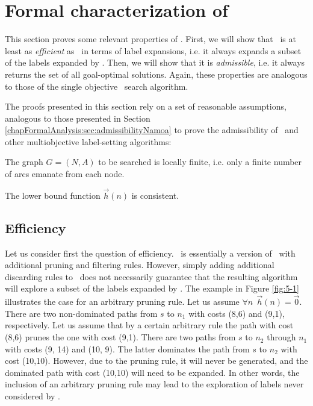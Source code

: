 \section{Formal characterization of \texorpdfstring{\lexgo}{LEXGO*}}
\label{chapFormalAnalysis:sec:analysisLEXGO}

This section proves some relevant properties of \lexgo. First, we will show that \lexgo \ is at least as \emph{efficient} as \namoa \ in terms of label expansions, i.e. it always expands a subset of the labels expanded by \namoa. Then, we will show that it is \emph{admissible}, i.e. it always returns the set of all goal-optimal solutions. Again, these properties are analogous to those of the single objective \astar \ search algorithm. 

The proofs presented in this section rely on a set of reasonable
assumptions, analogous to those presented in Section  \ref{chapFormalAnalysis:sec:admissibilityNamoa} to prove the admissibility of \namoa \ and other multiobjective label-setting algorithms:

\begin{supo}\label{supo-lexgo1}
The graph $G = (N,A)$ to be searched is locally finite, i.e. only a finite number of arcs emanate from each node.
\end{supo}

\begin{supo}\label{supo-lexgo2}
The lower bound function $\vec{h}(n)$ is consistent.
\end{supo}

\subsection{Efficiency}
\label{chapFormalAnalysis:sec:efficiencyLexgo}

Let us consider first the question of efficiency. \lexgo \ is essentially a version of \namoa \ with additional pruning and filtering rules. However, simply adding additional discarding rules to \namoa \ does not necessarily guarantee that the resulting algorithm will explore a subset of the labels expanded by \namoa. The example in Figure \ref{fig:5-1} illustrates the case for an arbitrary pruning rule. Let us assume $\forall n \ \ \vec h(n) = \vec 0$. There are two non-dominated paths from $s$ to $n_1$ with costs (8,6) and (9,1), respectively. Let us assume that by a certain arbitrary rule the path with cost (8,6) prunes the one with cost (9,1). There are two paths from $s$ to $n_2$ through $n_1$ with costs (9, 14) and (10, 9). The latter dominates the path from $s$ to $n_2$ with cost (10,10). However, due to the pruning rule, it will never be generated, and the dominated path with cost (10,10) will need to be expanded. In other words, the inclusion of an arbitrary pruning rule may lead to the exploration of labels never considered by \namoa.

